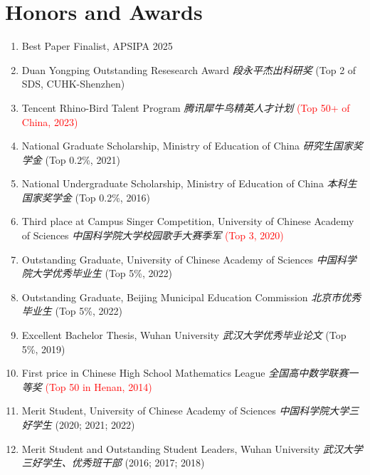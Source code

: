\documentclass{resume}
\begin{document}
\section{Honors and Awards}
\begin{enumerate}
  \item Best Paper Finalist, APSIPA 2025
  \item Duan Yongping Outstanding Resesearch Award \textit{段永平杰出科研奖} (Top 2 of SDS, CUHK-Shenzhen)
  \item Tencent Rhino-Bird Talent Program \textit{腾讯犀牛鸟精英人才计划} \textcolor{red}{(Top 50+ of China, 2023)}
  \item National Graduate Scholarship, Ministry of Education of China \textit{研究生国家奖学金}
        (Top 0.2\%, 2021)
  \item National Undergraduate Scholarship, Ministry of Education of China
        \textit{本科生国家奖学金} (Top 0.2\%, 2016)
  \item Third place at Campus Singer Competition, University of Chinese Academy of
        Sciences \textit{中国科学院大学校园歌手大赛季军} \textcolor{red}{(Top 3, 2020)}
  \item Outstanding Graduate, University of Chinese Academy of Sciences
        \textit{中国科学院大学优秀毕业生} (Top 5\%, 2022)
  \item Outstanding Graduate, Beijing Municipal Education Commission \textit{北京市优秀毕业生}
        (Top 5\%, 2022)
  \item Excellent Bachelor Thesis, Wuhan University \textit{武汉大学优秀毕业论文} (Top 5\%, 2019)
  \item First price in Chinese High School Mathematics League \textit{全国高中数学联赛一等奖} \textcolor{red}{(Top
        50 in Henan, 2014)}
  \item Merit Student, University of Chinese Academy of Sciences \textit{中国科学院大学三好学生}
        (2020; 2021; 2022)
  \item Merit Student and Outstanding Student Leaders, Wuhan University
        \textit{武汉大学三好学生、优秀班干部} (2016; 2017; 2018)
\end{enumerate}


\end{document}
